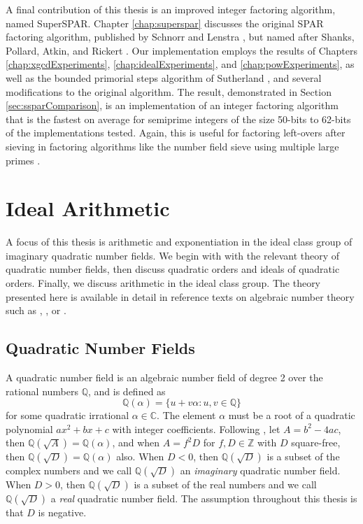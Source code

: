\documentclass{ucalgthes1}
\theoremstyle{definition}
\newcommand{\CC}{\mathbb{C}}
\newcommand{\ZZ}{\mathbb{Z}}
\newcommand{\QQ}{\mathbb{Q}}
\begin{document}
A final contribution of this thesis is an improved integer factoring algorithm, named \mbox{SuperSPAR}.  Chapter \ref{chap:superspar} discusses the original SPAR factoring algorithm, published by Schnorr and Lenstra \cite{Schnorr1984}, but named after Shanks, Pollard, Atkin, and Rickert \cite[p.484]{Lenstra1992}.  Our implementation employs the results of Chapters \ref{chap:xgcdExperiments}, \ref{chap:idealExperiments}, and \ref{chap:powExperiments}, as well as the bounded primorial steps algorithm of Sutherland \cite{Sutherland2007}, and several modifications to the original algorithm.  The result, demonstrated in Section \ref{sec:ssparComparison}, is an implementation of an integer factoring algorithm that is the fastest on average for semiprime integers of the size 50-bits to 62-bits of the implementations tested.  Again, this is useful for factoring left-overs after sieving in factoring algorithms like the number field sieve using multiple large primes \cite[\S 6.1.4]{Crandall2001}.


\chapter{Ideal Arithmetic}
\label{chap:idealArithmetic}

A focus of this thesis is arithmetic and exponentiation in the ideal class group of imaginary quadratic number fields.  We begin with with the relevant theory of quadratic number fields, then discuss quadratic orders and ideals of quadratic orders.  Finally, we discuss arithmetic in the ideal class group.  The theory presented here is available in detail in reference texts on algebraic number theory such as \cite{Cohn1980}, \cite{Hua2012}, or \cite{Ireland1990}. 


\section{Quadratic Number Fields}

A quadratic number field is an algebraic number field of degree 2 over the rational numbers $\QQ$, and is defined as
\[
	\QQ(\alpha) = \{u + v\alpha : u,v \in \QQ\}
\]
for some quadratic irrational $\alpha \in \CC$.  The element $\alpha$ must be a root of a quadratic polynomial $ax^2 + bx + c$ with integer coefficients.  Following \cite[p.188]{Ireland1990}, let $A = b^2-4ac$, then $\QQ(\sqrt A) = \QQ(\alpha)$, and when $A = f^2 D$ for $f, D \in \ZZ$ with $D$ square-free, then $\QQ(\sqrt D) = \QQ(\alpha)$ also.  When $D < 0$, then $\QQ(\sqrt D)$ is a subset of the complex numbers and we call $\QQ(\sqrt D)$ an \emph{imaginary} quadratic number field.  When $D > 0$, then $\QQ(\sqrt D)$ is a subset of the real numbers and we call $\QQ(\sqrt D)$ a \emph{real} quadratic number field.  The assumption throughout this thesis is that $D$ is negative.
\end{document}
